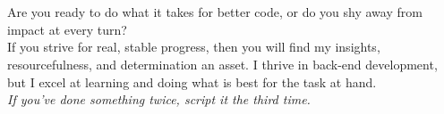 \noindent\begin{minipage}[l]{0.9\textwidth}
\noindent\\
\\
Are you ready to do what it takes for better code, or do you shy away from impact at every turn?\\
If you strive for real, stable progress, then you will find my insights, resourcefulness, and determination an asset. I thrive in back-end development, but I excel at learning and doing what is best for the task at hand.\\[5pt]
\textit{If you've done something twice, script it the third time.}
\end{minipage}
